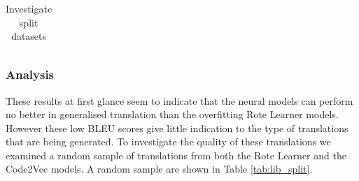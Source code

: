 \begin{table}[!ht]
\begin{center}
\begin{tabular}{ c | c | c }
    \hline
\end{tabular}
\caption {Investigate split datasets}
\label{table:split_datasets_embed}
\end{center}
\end{table}




\subsubsection{Analysis}

These results at first glance seem to indicate that the neural models can perform no better in generalised translation than the overfitting Rote Learner models.
However these low BLEU scores give little indication to the type of translations that are being generated.
To investigate the quality of these translations we examined a random sample of translations from both the Rote Learner and the Code2Vec models. 
A random sample are shown in Table \ref{tab:lib_split}.

